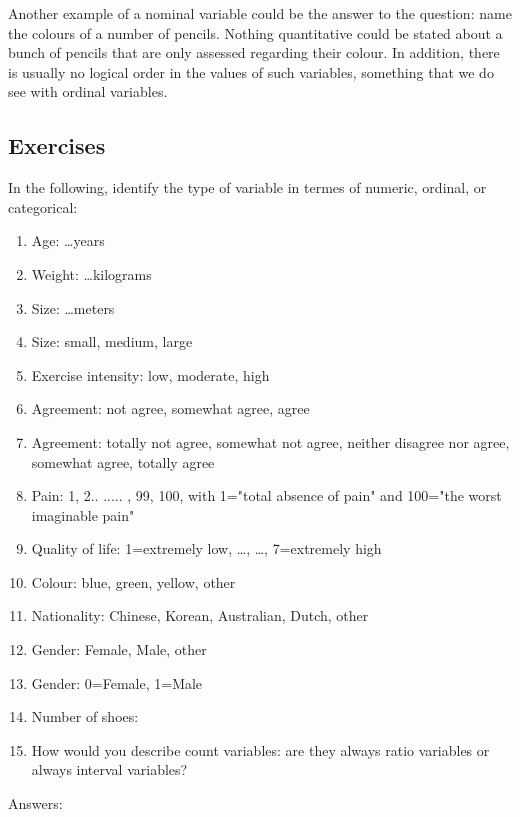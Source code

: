 \documentclass[]{report}\usepackage[]{graphicx}\usepackage[]{color}
\begin{document}
Another example of a nominal variable could be the answer to the question: name the colours of a number of pencils. Nothing quantitative could be stated about a bunch of pencils that are only assessed regarding their colour. In addition, there is usually no logical order in the values of such variables, something that we do see with ordinal variables.

\subsection{Exercises}
In the following, identify the type of variable in termes of numeric, ordinal, or categorical:
\begin{enumerate}
\item Age: \dots years
\item Weight: \dots kilograms
\item Size: \dots meters
\item Size: small, medium, large
\item Exercise intensity: low, moderate, high
\item Agreement: not agree, somewhat agree, agree
\item Agreement: totally not agree, somewhat not agree, neither disagree nor agree, somewhat agree, totally agree
\item Pain: 1, 2.. ..... , 99, 100, with 1="total absence of pain" and 100="the worst imaginable pain"
\item Quality of life: 1=extremely low, \dots, \dots, 7=extremely high
\item Colour: blue, green, yellow, other
\item Nationality: Chinese, Korean, Australian, Dutch, other
\item Gender: Female, Male, other
\item Gender: 0=Female, 1=Male
\item Number of shoes:
\item How would you describe count variables: are they always ratio variables or always interval variables?
\end{enumerate}

Answers:
\end{document}
